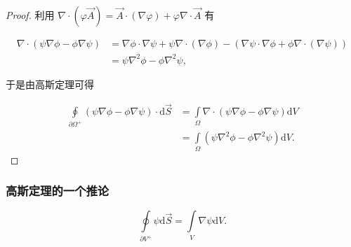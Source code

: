 \begin{proof}

利用 $\nabla\cdot\left(\varphi\vec{A}\right)=\vec{A}\cdot(\nabla\varphi) + \varphi\nabla\cdot\vec{A} $ 有

\begin{equation}
\begin{split}
\nabla\cdot(\psi\nabla\phi-\phi\nabla\psi)
&=\nabla\phi\cdot\nabla\psi + \psi\nabla\cdot(\nabla\phi) - \left(\nabla\psi\cdot\nabla\phi + \phi\nabla\cdot(\nabla\psi) \right) \\
&=\psi\nabla^2\phi-\phi\nabla^2\psi,
\end{split}
\end{equation}

于是由高斯定理可得

\begin{equation}
\begin{split}
\oint\limits_{\partial\Omega^+}\left(\psi\nabla\phi-\phi\nabla\psi \right)\cdot\mathrm{d}\vec{S}
&=\int\limits_{\Omega} \nabla\cdot(\psi\nabla\phi-\phi\nabla\psi) \mathrm{d}V \\
&=\int\limits_{\Omega} \left(\psi\nabla^2\phi-\phi\nabla^2\psi\right) \mathrm{d}V.
\end{split}
\end{equation}

\end{proof}

\subsubsection{高斯定理的一个推论}

\begin{example}
\begin{equation}
\oint\limits_{\partial V^+} \psi \mathrm{d}\vec{S}
=\int\limits_{V} \nabla \psi \mathrm{d}V.
\end{equation}
\end{example}

